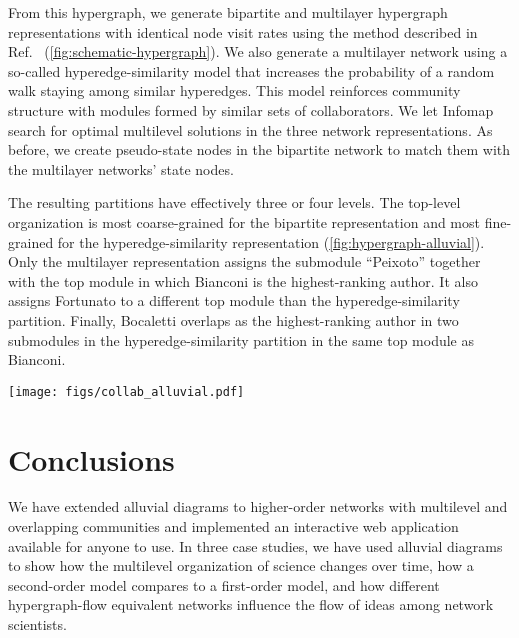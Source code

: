 \documentclass[aps,rmp,floats,floatfix,twocolumn,superscriptaddress,final]{revtex4-2}
\begin{document}
From this hypergraph, we generate bipartite and multilayer hypergraph representations with identical node visit rates using the method described in Ref.\  (\cref{fig:schematic-hypergraph}).
We also generate a multilayer network using a so-called hyperedge-similarity model that increases the probability of a random walk staying among similar hyperedges.\cite{eriksson2021choosing}
This model reinforces community structure with modules formed by similar sets of collaborators.
We let Infomap search for optimal multilevel solutions in the three network representations.
As before, we create pseudo-state nodes in the bipartite network to match them with the multilayer networks' state nodes.

The resulting partitions have effectively three or four levels.
The top-level organization is most coarse-grained for the bipartite representation and most fine-grained for the hyperedge-similarity representation (\cref{fig:hypergraph-alluvial}). 
Only the multilayer representation assigns the submodule ``Peixoto'' together with the top module in which Bianconi is the highest-ranking author.
It also assigns Fortunato to a different top module than the hyperedge-similarity partition.
Finally, Bocaletti overlaps as the highest-ranking author in two submodules in the hyperedge-similarity partition in the same top module as Bianconi. 

\begin{figure*}[hpt!]
    \centering
    \texttt{[image: figs/collab\_alluvial.pdf]}
    \caption{Network science collaboration hypergraph represented with two visit-rate-equivalent networks and a model that favors flow staying inside similar hyperedges. Modules are sorted to minimize overlap and show the names of their highest-ranking researchers. Here, we show the second-deepest level. Author groups that change top-level assignments in different networks are highlighted.}
    \label{fig:hypergraph-alluvial}
\end{figure*}

\section*{Conclusions}

We have extended alluvial diagrams to higher-order networks with multilevel and overlapping communities and implemented an interactive web application available for anyone to use.
In three case studies, we have used alluvial diagrams to show how the multilevel organization of science changes over time, how a second-order model compares to a first-order model, and how different hypergraph-flow equivalent networks influence the flow of ideas among network scientists.
\end{document}
